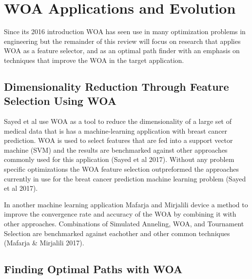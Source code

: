 \documentclass[11pt]{article}
\begin{document}
\section*{WOA Applications and Evolution}
Since its 2016 introduction WOA has seen use in many optimization problems in engineering but the remainder of this review will focus on research that applies WOA as a feature selector, and as an optimal path finder with an emphasis on techniques that improve the WOA in the target application.

\subsection*{Dimensionality Reduction Through Feature Selection Using WOA}
Sayed et al use WOA as a tool to reduce the dimensionality of a large set of medical data that is has a machine-learning application with breast cancer prediction.
WOA is used to select features that are fed into a support vector machine (SVM) and the results are benchmarked against other approaches commonly used for this application (Sayed et al 2017).
Without any problem specific optimizations the WOA feature selection outpreformed the approaches currently in use for the breat cancer prediction machine learning problem (Sayed et al 2017).

In another machine learning application Mafarja and Mirjalili device a method to improve the convergence rate and accuracy of the WOA by combining it with other approaches.
Combinations of Simulated Anneling, WOA, and Tournament Selection are benchmarked against eachother and other common techniques (Mafarja \& Mirjalili 2017).


\subsection*{Finding Optimal Paths with WOA}
\end{document}
